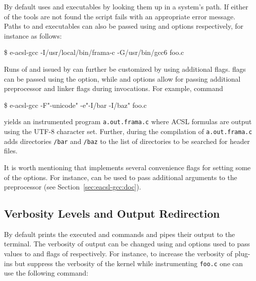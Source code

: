 By default \eacslgcc uses  and  executables by looking them
up in a system's path. If either of the tools are not found the script fails
with an appropriate error message. Paths to \framac and \gcc executables can
also be passed using  and  options
respectively, for instance as follows:

\begin{frama-c-commands}
\$ e-acsl-gcc -I/usr/local/bin/frama-c -G/usr/bin/gcc6 foo.c
\end{frama-c-commands}

Runs of \framac and \gcc issued by \eacslgcc can further be customized by using
additional flags.  \framac flags can be passed using the  option,
while  and  options allow for passing additional
preprocessor and linker flags during \gcc invocations.  For example, command

\begin{frama-c-commands}
\$ e-acsl-gcc -F"-unicode" -e"-I/bar -I/baz" foo.c
\end{frama-c-commands}

yields an instrumented program \texttt{a.out.frama.c} where ACSL formulas
are output using the UTF-8 character set. Further, during the compilation of
\texttt{a.out.frama.c} \gcc adds directories \texttt{/bar} and
\texttt{/baz} to the list of directories to be searched for header files.

It is worth mentioning that \eacslgcc implements several convenience flags for
setting some of the \framac options. For instance,  can be used to
pass additional arguments to the \framac preprocessor (see
Section~\ref{sec:eacsl-gcc:doc}).

\subsection{Verbosity Levels and Output Redirection}

By default \eacslgcc prints the executed \framac and \gcc commands and pipes
their output to the terminal. The verbosity of \framac output can be changed
using  and  options used to pass values to
 and  flags of \framac respectively.  For
instance, to increase the verbosity of plug-ins but suppress the verbosity of
the \framac kernel while instrumenting \texttt{foo.c} one can use the following
command:

